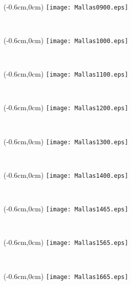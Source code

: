 \documentclass[12pt,letterpaper,oneside]{report}
\begin{document}
\ \pagebreak

\begin{textblock*}{\paperwidth}(-0.6cm,0cm)
\texttt{[image: Mallas0900.eps]}
\end{textblock*}

\ \pagebreak

\begin{textblock*}{\paperwidth}(-0.6cm,0cm)
\texttt{[image: Mallas1000.eps]}
\end{textblock*}

\ \pagebreak

\begin{textblock*}{\paperwidth}(-0.6cm,0cm)
\texttt{[image: Mallas1100.eps]}
\end{textblock*}

\ \pagebreak

\begin{textblock*}{\paperwidth}(-0.6cm,0cm)
\texttt{[image: Mallas1200.eps]}
\end{textblock*}

\ \pagebreak

\begin{textblock*}{\paperwidth}(-0.6cm,0cm)
\texttt{[image: Mallas1300.eps]}
\end{textblock*}

\ \pagebreak

\begin{textblock*}{\paperwidth}(-0.6cm,0cm)
\texttt{[image: Mallas1400.eps]}
\end{textblock*}

\ \pagebreak

\begin{textblock*}{\paperwidth}(-0.6cm,0cm)
\texttt{[image: Mallas1465.eps]}
\end{textblock*}

\ \pagebreak

\begin{textblock*}{\paperwidth}(-0.6cm,0cm)
\texttt{[image: Mallas1565.eps]}
\end{textblock*}

\ \pagebreak

\begin{textblock*}{\paperwidth}(-0.6cm,0cm)
\texttt{[image: Mallas1665.eps]}
\end{textblock*}
\end{document}
